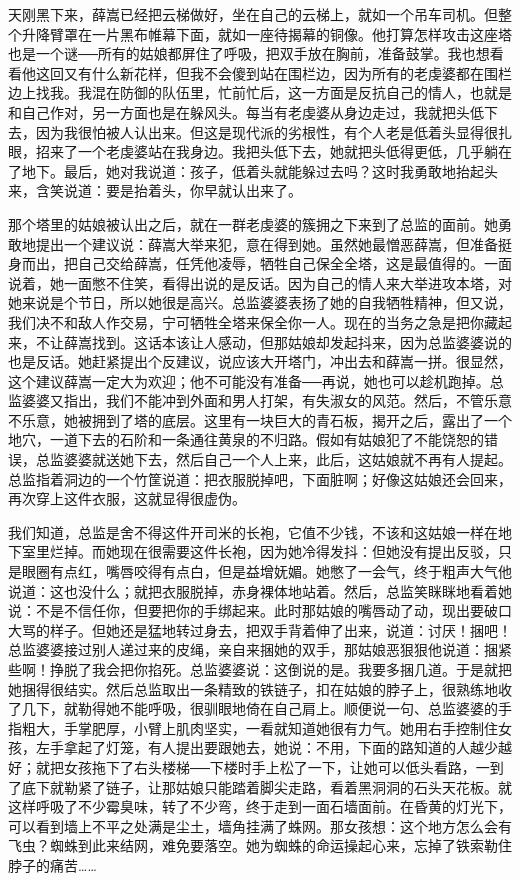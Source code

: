 天刚黑下来，薛嵩已经把云梯做好，坐在自己的云梯上，就如一个吊车司机。但整个升降臂罩在一片黑布帷幕下面，就如一座待揭幕的铜像。他打算怎样攻击这座塔也是一个谜──所有的姑娘都屏住了呼吸，把双手放在胸前，准备鼓掌。我也想看看他这回又有什么新花样，但我不会傻到站在围栏边，因为所有的老虔婆都在围栏边上找我。我混在防御的队伍里，忙前忙后，这一方面是反抗自己的情人，也就是和自己作对，另一方面也是在躲风头。每当有老虔婆从身边走过，我就把头低下去，因为我很怕被人认出来。但这是现代派的劣根性，有个人老是低着头显得很扎眼，招来了一个老虔婆站在我身边。我把头低下去，她就把头低得更低，几乎躺在了地下。最后，她对我说道：孩子，低着头就能躲过去吗？这时我勇敢地抬起头来，含笑说道：要是抬着头，你早就认出来了。 

那个塔里的姑娘被认出之后，就在一群老虔婆的簇拥之下来到了总监的面前。她勇敢地提出一个建议说：薛嵩大举来犯，意在得到她。虽然她最憎恶薛嵩，但准备挺身而出，把自己交给薛嵩，任凭他凌辱，牺牲自己保全全塔，这是最值得的。一面说着，她一面憋不住笑，看得出说的是反话。因为自己的情人来大举进攻本塔，对她来说是个节日，所以她很是高兴。总监婆婆表扬了她的自我牺牲精神，但又说，我们决不和敌人作交易，宁可牺牲全塔来保全你一人。现在的当务之急是把你藏起来，不让薛嵩找到。这话本该让人感动，但那姑娘却发起抖来，因为总监婆婆说的也是反话。她赶紧提出个反建议，说应该大开塔门，冲出去和薛嵩一拼。很显然，这个建议薛嵩一定大为欢迎；他不可能没有准备──再说，她也可以趁机跑掉。总监婆婆又指出，我们不能冲到外面和男人打架，有失淑女的风范。然后，不管乐意不乐意，她被拥到了塔的底层。这里有一块巨大的青石板，揭开之后，露出了一个地穴，一道下去的石阶和一条通往黄泉的不归路。假如有姑娘犯了不能饶恕的错误，总监婆婆就送她下去，然后自己一个人上来，此后，这姑娘就不再有人提起。总监指着洞边的一个竹筐说道：把衣服脱掉吧，下面脏啊；好像这姑娘还会回来，再次穿上这件衣服，这就显得很虚伪。 

我们知道，总监是舍不得这件开司米的长袍，它值不少钱，不该和这姑娘一样在地下室里烂掉。而她现在很需要这件长袍，因为她冷得发抖：但她没有提出反驳，只是眼圈有点红，嘴唇咬得有点白，但是益增妩媚。她憋了一会气，终于粗声大气他说道：这也没什么；就把衣服脱掉，赤身裸体地站着。然后，总监笑眯眯地看着她说：不是不信任你，但要把你的手绑起来。此时那姑娘的嘴唇动了动，现出要破口大骂的样子。但她还是猛地转过身去，把双手背着伸了出来，说道：讨厌！捆吧！总监婆婆接过别人递过来的皮绳，亲自来捆她的双手，那姑娘恶狠狠他说道：捆紧些啊！挣脱了我会把你掐死。总监婆婆说：这倒说的是。我要多捆几道。于是就把她捆得很结实。然后总监取出一条精致的铁链子，扣在姑娘的脖子上，很熟练地收了几下，就勒得她不能呼吸，很驯眼地倚在自己肩上。顺便说一句、总监婆婆的手指粗大，手掌肥厚，小臂上肌肉坚实，一看就知道她很有力气。她用右手控制住女孩，左手拿起了灯笼，有人提出要跟她去，她说：不用，下面的路知道的人越少越好；就把女孩拖下了右头楼梯──下楼时手上松了一下，让她可以低头看路，一到了底下就勒紧了链子，让那姑娘只能踏着脚尖走路，看着黑洞洞的石头天花板。就这样呼吸了不少霉臭味，转了不少弯，终于走到一面石墙面前。在昏黄的灯光下，可以看到墙上不平之处满是尘土，墙角挂满了蛛网。那女孩想：这个地方怎么会有飞虫？蜘蛛到此来结网，难免要落空。她为蜘蛛的命运操起心来，忘掉了铁索勒住脖子的痛苦…… 

